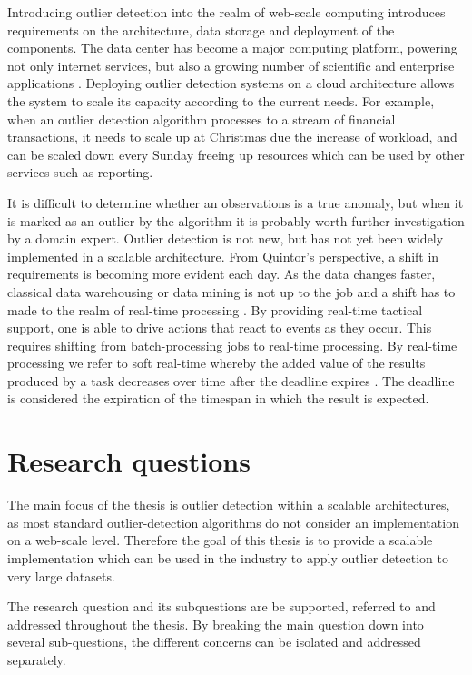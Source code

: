 Introducing outlier detection into the realm of web-scale computing introduces requirements on the architecture, data storage and deployment of the components. The data center has become a major computing platform, powering not only internet services, but also a growing number of scientific and enterprise applications \cite{Zaharia:2011:DNO:2170444.2170461}. Deploying outlier detection systems on a cloud architecture allows the system to scale its capacity according to the current needs. For example, when an outlier detection algorithm processes to a stream of financial transactions, it needs to scale up at Christmas due the increase of workload, and can be scaled down every Sunday freeing up resources which can be used by other services such as reporting.

It is difficult to determine whether an observations is a true anomaly, but when it is marked as an outlier by the algorithm it is probably worth further investigation by a domain expert. Outlier detection is not new, but has not yet been widely implemented in a scalable architecture. From Quintor's perspective, a shift in requirements is becoming more evident each day. As the data changes faster, classical data warehousing or data mining is not up to the job and a shift has to made to the realm of real-time processing \cite{1640284}. By providing real-time tactical support, one is able to drive actions that react to events as they occur. This requires shifting from batch-processing jobs to real-time processing. By real-time processing we refer to soft real-time whereby the added value of the results produced by a task decreases over time after the deadline expires \cite{259423}. The deadline is considered the expiration of the timespan in which the result is expected.

\section{Research questions \label{sec1-researchquestions}}

The main focus of the thesis is outlier detection within a scalable architectures, as most standard outlier-detection algorithms do not consider an implementation on a web-scale level. Therefore the goal of this thesis is to provide a scalable implementation which can be used in the industry to apply outlier detection to very large datasets.

The research question and its subquestions are be supported, referred to and addressed throughout the thesis. By breaking the main question down into several sub-questions, the different concerns can be isolated and addressed separately.

